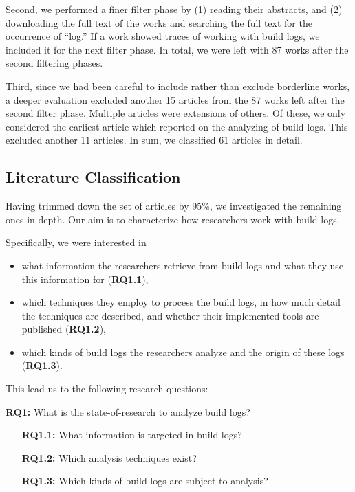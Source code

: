 Second, we performed a finer filter phase by (1) reading their abstracts,
and (2) downloading the
full text of the works and searching the
full text
for the occurrence of ``log.''
If a work showed traces of
working with build logs, we included it for the next filter phase.
In total, we
were left with 87 works after the second filtering phases.

Third, since we had been careful to include rather than exclude borderline
works, a deeper evaluation excluded another 15 articles from the 87
works left after the second filter phase.
Multiple articles were extensions of others.
Of these, we only considered the earliest article which reported on
the analyzing of build logs.
This excluded another 11 articles.
In sum, we classified 61 articles in detail.

\subsection{Literature Classification}
Having trimmed down the set of articles by 95\%, we investigated the
remaining ones in-depth.
Our aim is to characterize how researchers work with build logs.

Specifically, we were interested in
\begin{itemize}
  \item what information the researchers retrieve from build logs and
  what they use this information for (\textbf{RQ1.1}),
  \item which techniques they employ to process the build logs,
  in how much detail the techniques are described,
	and whether their implemented tools are published
  (\textbf{RQ1.2}),
  \item which kinds of build logs the researchers analyze
	and the origin of these logs (\textbf{RQ1.3}).
\end{itemize}

This lead us to the following research questions:
\begin{simplebox}[attach boxed title to top center={yshift=-6mm}]
{\textbf{RQ1:} What is the state-of-research to analyze build logs?}
\begin{itemize}[leftmargin=1cm]
  \item[\textbf{RQ1.1:}] What information is targeted in build logs?
  \item[\textbf{RQ1.2:}] Which analysis techniques exist?
  \item[\textbf{RQ1.3:}] Which kinds of build logs are subject to
  analysis?
\end{itemize}
\end{simplebox}

